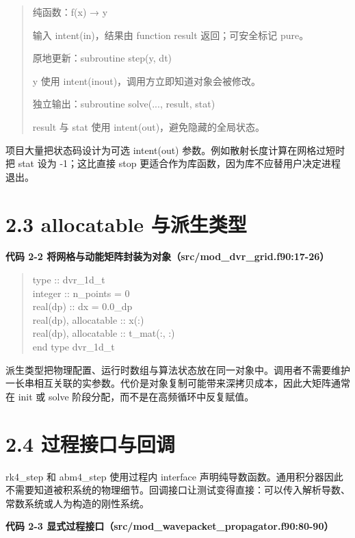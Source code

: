 \documentclass[UTF8,openany,11pt,fontset=fandol]{ctexbook}
\begin{document}
\begin{quote}
纯函数：f(x) → y

输入 intent(in)，结果由 function result 返回；可安全标记 pure。

原地更新：subroutine step(y, dt)

y 使用 intent(inout)，调用方立即知道对象会被修改。

独立输出：subroutine solve(..., result, stat)

result 与 stat 使用 intent(out)，避免隐藏的全局状态。
\end{quote}

项目大量把状态码设计为可选 intent(out)
参数。例如散射长度计算在网格过短时把 stat 设为 -1；这比直接 stop
更适合作为库函数，因为库不应替用户决定进程退出。

\section{\texorpdfstring{\textbf{2.3 allocatable
与派生类型}}{2.3 allocatable 与派生类型}}\label{allocatable-ux4e0eux6d3eux751fux7c7bux578b}

\textbf{代码 2-2
将网格与动能矩阵封装为对象（src/mod\_dvr\_grid.f90:17-26）}

\begin{quote}
type :: dvr\_1d\_t\\
integer :: n\_points = 0\\
real(dp) :: dx = 0.0\_dp\\
real(dp), allocatable :: x(:)\\
real(dp), allocatable :: t\_mat(:, :)\\
end type dvr\_1d\_t
\end{quote}

派生类型把物理配置、运行时数组与算法状态放在同一对象中。调用者不需要维护一长串相互关联的实参数。代价是对象复制可能带来深拷贝成本，因此大矩阵通常在
init 或 solve 阶段分配，而不是在高频循环中反复赋值。

\section{\texorpdfstring{\textbf{2.4
过程接口与回调}}{2.4 过程接口与回调}}\label{ux8fc7ux7a0bux63a5ux53e3ux4e0eux56deux8c03}

rk4\_step 和 abm4\_step 使用过程内 interface
声明纯导数函数。通用积分器因此不需要知道被积系统的物理细节。回调接口让测试变得直接：可以传入解析导数、常数系统或人为构造的刚性系统。

\textbf{代码 2-3
显式过程接口（src/mod\_wavepacket\_propagator.f90:80-90）}
\end{document}
